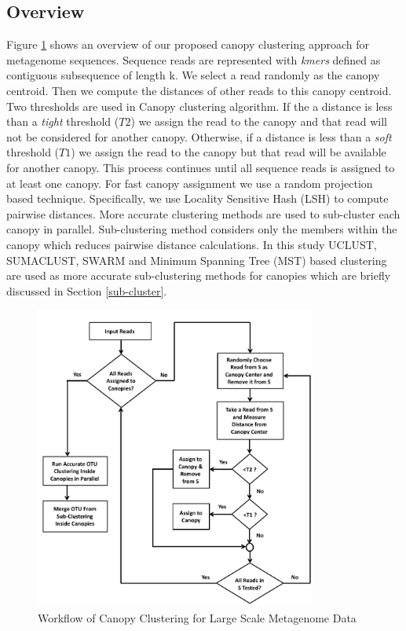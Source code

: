 \documentclass[10pt, conference, compsocconf]{IEEEtran}
\begin{document}
\subsection{\textbf{Overview}}

Figure \ref{fig:flowchart} shows an overview of our proposed canopy clustering approach for metagenome sequences. Sequence reads are represented with \textit{kmers} defined as contiguous subsequence of length k. We select a read randomly as the canopy centroid. Then we compute the distances of other reads to this canopy centroid. Two thresholds are used in Canopy clustering algorithm. If the a distance is less than a \emph{tight} threshold ($T2$) we assign the read to the canopy and that read will not be considered for another canopy. Otherwise, if a distance is less than a \emph{soft} threshold ($T1$) we assign the read to the canopy but that read will be available for another canopy. This process continues until all sequence reads is assigned to at least one canopy. For fast canopy assignment we use a random projection based technique. Specifically, we use Locality Sensitive Hash (LSH) to compute pairwise distances. More accurate clustering methods are used to sub-cluster each canopy in parallel. Sub-clustering method considers only the members within the canopy which reduces pairwise distance calculations. In this study UCLUST, SUMACLUST, SWARM and Minimum Spanning Tree (MST) based clustering are used as more accurate sub-clustering methods for canopies which are briefly discussed in Section \ref{sub-cluster}.

\begin{figure}
	\centering
	\includegraphics[width=\linewidth,height=10cm]{flowchart.pdf}	
	\caption{Workflow of Canopy Clustering for Large Scale Metagenome Data}
	\label{fig:flowchart}
\end{figure}
\end{document}
